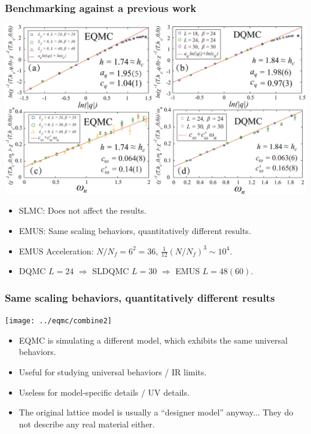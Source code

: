 \documentclass[xcolor=table, 10pt, aspectratio=43]{beamer}
\begin{document}
\begin{frame}
  \frametitle{Benchmarking against a previous work}
  \begin{center}
    \includegraphics[width=\textwidth]{../eqmc/chiwqanalysis.pdf}
  \end{center}
\begin{itemize}
	\item SLMC: Does not affect the results.
	\item EMUS: Same scaling behaviors, quantitatively different results.
  \item EMUS Acceleration: $N/N_f=6^2=36$, $\frac1{12}(N/N_f)^3 \sim 10^4$.
	\item DQMC $L=24$ $\Rightarrow$ SLDQMC $L=30$ $\Rightarrow$ EMUS $L=48(60)$.
\end{itemize}
\end{frame}

\begin{frame}
  \frametitle{Same scaling behaviors, quantitatively different results}
  \begin{center}
    \texttt{[image: ../eqmc/combine2]}
  \end{center}
  \begin{itemize}
    \item EQMC is simulating a \alert{different} model, which exhibits the same universal behaviors.
		\item Useful for studying universal behaviors / IR limits.
		\item Useless for model-specific details / UV details.
		\item The original lattice model is usually a ``designer model'' anyway... They do not describe any real material either.
  \end{itemize}
\end{frame}
\end{document}
